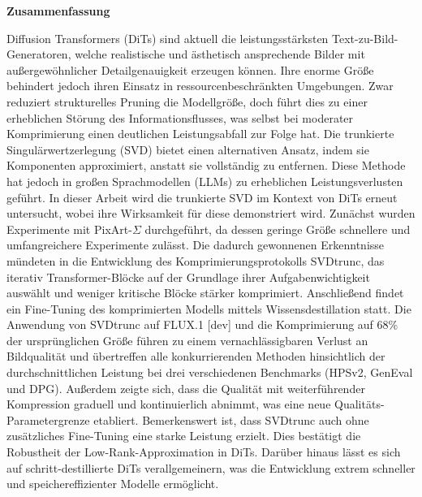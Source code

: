     
    \newpage
    \thispagestyle{plain}
    \begin{center}
    	\textbf{Zusammenfassung}\\
    \end{center}
    Diffusion Transformers (\gls{DiT}s) sind aktuell die leistungsstärksten Text-zu-Bild-Generatoren, welche realistische und ästhetisch ansprechende Bilder mit außergewöhnlicher Detailgenauigkeit erzeugen können. Ihre enorme Größe behindert jedoch ihren Einsatz in ressourcenbeschränkten Umgebungen. 
    Zwar reduziert strukturelles Pruning die Modellgröße, doch führt dies zu einer erheblichen Störung des Informationsflusses, was selbst bei moderater Komprimierung einen deutlichen Leistungsabfall zur Folge hat. Die trunkierte Singulärwertzerlegung (SVD) bietet einen alternativen Ansatz, indem sie Komponenten approximiert, anstatt sie vollständig zu entfernen. Diese Methode hat jedoch in großen Sprachmodellen (\gls{LLM}s) zu erheblichen Leistungsverlusten geführt.
     In dieser Arbeit wird die trunkierte SVD im Kontext von \gls{DiT}s erneut untersucht, wobei ihre Wirksamkeit für diese demonstriert wird. Zunächst wurden Experimente mit PixArt-$\Sigma$ durchgeführt, da dessen geringe Größe schnellere und umfangreichere Experimente zulässt. Die dadurch gewonnenen Erkenntnisse mündeten in die Entwicklung des Komprimierungsprotokolls SVDtrunc, das iterativ Transformer-Blöcke auf der Grundlage ihrer Aufgabenwichtigkeit auswählt und weniger kritische Blöcke stärker komprimiert. Anschließend findet ein Fine-Tuning des komprimierten Modells mittels Wissensdestillation statt. Die Anwendung von \gls{SVD}trunc auf FLUX.1 [dev] und die Komprimierung auf 68\% der ursprünglichen Größe führen zu einem vernachlässigbaren Verlust an Bildqualität und übertreffen alle konkurrierenden Methoden hinsichtlich der durchschnittlichen Leistung bei drei verschiedenen Benchmarks (HPSv2, GenEval und DPG). Außerdem zeigte sich, dass die Qualität mit weiterführender Kompression graduell und kontinuierlich abnimmt, was eine neue Qualitäts-Parametergrenze etabliert. Bemerkenswert ist, dass \gls{SVD}trunc auch ohne zusätzliches Fine-Tuning eine starke Leistung erzielt. Dies bestätigt die Robustheit der Low-Rank-Approximation in \gls{DiT}s. Darüber hinaus lässt es sich auf schritt-destillierte \gls{DiT}s verallgemeinern, was die Entwicklung extrem schneller und speichereffizienter Modelle ermöglicht.
     
     
     
    
    
%    
    
